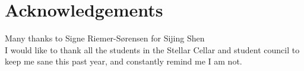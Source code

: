 \section{Acknowledgements}

Many thanks to Signe Riemer-S{\o}rensen for  Sijing Shen  \\

I would like to thank all the students in the Stellar Cellar and student council to keep me sane this past year,
and constantly remind me I am not.
